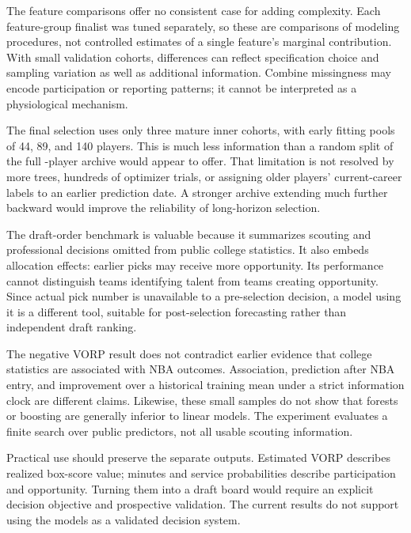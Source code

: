 \documentclass[11pt]{article}
\begin{document}
The feature comparisons offer no consistent case for adding complexity. Each feature-group finalist was tuned separately, so these are comparisons of modeling procedures, not controlled estimates of a single feature's marginal contribution. With small validation cohorts, differences can reflect specification choice and sampling variation as well as additional information. Combine missingness may encode participation or reporting patterns; it cannot be interpreted as a physiological mechanism.

The final selection uses only three mature inner cohorts, with early fitting pools of 44, 89, and 140 players. This is much less information than a random split of the full \SampleN{}-player archive would appear to offer. That limitation is not resolved by more trees, hundreds of optimizer trials, or assigning older players' current-career labels to an earlier prediction date. A stronger archive extending much further backward would improve the reliability of long-horizon selection.

The draft-order benchmark is valuable because it summarizes scouting and professional decisions omitted from public college statistics. It also embeds allocation effects: earlier picks may receive more opportunity. Its performance cannot distinguish teams identifying talent from teams creating opportunity. Since actual pick number is unavailable to a pre-selection decision, a model using it is a different tool, suitable for post-selection forecasting rather than independent draft ranking.

The negative VORP result does not contradict earlier evidence that college statistics are associated with NBA outcomes. Association, prediction after NBA entry, and improvement over a historical training mean under a strict information clock are different claims. Likewise, these small samples do not show that forests or boosting are generally inferior to linear models. The experiment evaluates a finite search over public predictors, not all usable scouting information.

Practical use should preserve the separate outputs. Estimated VORP describes realized box-score value; minutes and service probabilities describe participation and opportunity. Turning them into a draft board would require an explicit decision objective and prospective validation. The current results do not support using the models as a validated decision system.
\end{document}
